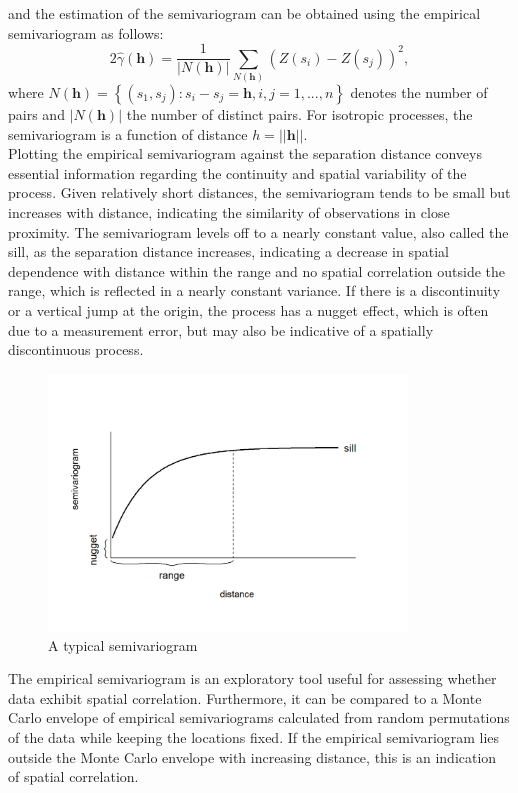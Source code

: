 and the estimation of the semivariogram can be obtained using the empirical semivariogram as follows:
\begin{equation}
    2\widehat{\gamma}\left(\pmb{h}\right)=\frac{1}{\left|N\left(\pmb{h}\right)\right|}\sum_{N\left(\pmb{h}\right)}\left(Z\left(s_i\right)-Z\left(s_j\right)\right)^2,
\end{equation}
where $N\left(\pmb{h}\right)=\left\lbrace\left(s_1,s_j\right):s_i-s_j=\pmb{h}, i,j=1,...,n\right\rbrace$ denotes the number of pairs and $\left|N\left(\pmb{h}\right)\right|$ the number of distinct pairs. For isotropic processes, the semivariogram is a function of distance $h=\left|\left|\pmb{h}\right|\right|$.   \\
Plotting the empirical semivariogram against the separation distance conveys essential information regarding the continuity and spatial variability of the process. Given relatively short distances, the semivariogram tends to be small but increases with distance, indicating the similarity of observations in close proximity. The semivariogram levels off to a nearly constant value, also called the sill, as the separation distance increases, indicating a decrease in spatial dependence with distance within the range and no spatial correlation outside the range, which is reflected in a nearly constant variance. If there is a discontinuity or a vertical jump at the origin, the process has a nugget effect, which is often due to a measurement error, but may also be indicative of a spatially discontinuous process.
\begin{figure}
    \centering
    \includegraphics[width=0.85\textwidth]{typicalsemivariogram-1.png}
    \caption{A typical semivariogram}
    \label{fig:my_label}
\end{figure}
The empirical semivariogram is an exploratory tool useful for assessing whether data exhibit spatial correlation. Furthermore, it can be compared to a Monte Carlo envelope of empirical semivariograms calculated from random permutations of the data while keeping the locations fixed. If the empirical semivariogram lies outside the Monte Carlo envelope with increasing distance, this is an indication of spatial correlation.\\
